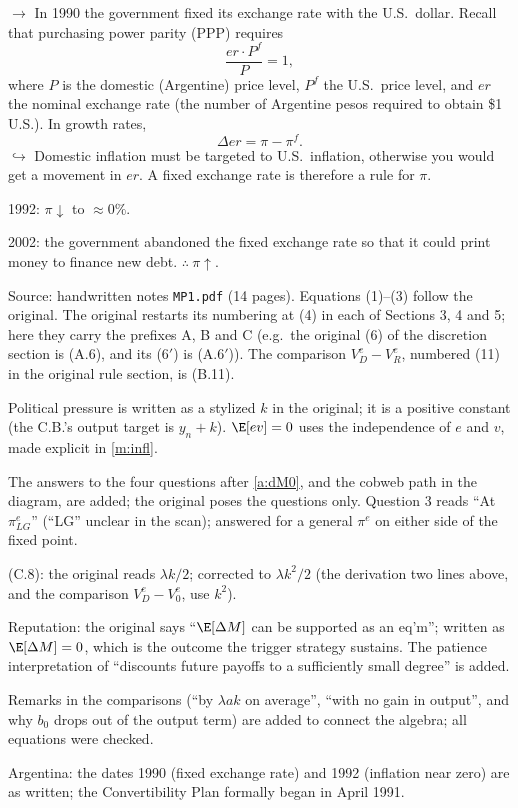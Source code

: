 \documentclass[11pt]{article}
\begin{document}
$\to$ In 1990 the government fixed its exchange rate with the U.S.\ dollar. Recall that
purchasing power parity (PPP) requires
\[
  \frac{er\cdot P^f}{P}=1,
\]
where $P$ is the domestic (Argentine) price level, $P^f$ the U.S.\ price level, and $er$
the nominal exchange rate (the number of Argentine pesos required to obtain \$1 U.S.).
In growth rates,
\[
  \Delta er=\pi-\pi^f .
\]
$\hookrightarrow$ Domestic inflation must be targeted to U.S.\ inflation, otherwise you
would get a movement in $er$. A fixed exchange rate is therefore a rule for $\pi$.

\begin{flatlist}
  \item 1992: $\pi\downarrow$ to $\approx 0\%$.
  \item 2002: the government abandoned the fixed exchange rate so that it could print
        money to finance new debt. $\therefore\ \pi\uparrow$.
\end{flatlist}


\begin{transcriptnotes}
  \item Source: handwritten notes \texttt{MP1.pdf} (14 pages). Equations (1)--(3) follow
        the original. The original restarts its numbering at (4) in each of Sections
        3, 4 and 5; here they carry the prefixes A, B and C (e.g.\ the original (6) of
        the discretion section is (A.6), and its (6$'$) is (A.6$'$)). The comparison
        $V_D^e-V_R^e$, numbered (11) in the original rule section, is (B.11).
  \item Political pressure is written as a stylized $k$ in the original; it is a
        positive constant (the C.B.'s output target is $y_n+k$). $\E[ev]=0$ uses the
        independence of $e$ and $v$, made explicit in \eqref{m:infl}.
  \item The answers to the four questions after \eqref{a:dM0}, and the cobweb path in
        the diagram, are added; the original poses the questions only. Question 3
        reads ``At $\pi^e_{LG}$'' (``LG'' unclear in the scan); answered for a general
        $\pi^e$ on either side of the fixed point.
  \item (C.8): the original reads $\lambda k/2$; corrected to $\lambda k^2/2$ (the
        derivation two lines above, and the comparison $V_D^e-V_0^e$, use $k^2$).
  \item Reputation: the original says ``$\E[\Delta M]$ can be supported as an eq'm'';
        written as $\E[\Delta M]=0$, which is the outcome the trigger strategy
        sustains. The patience interpretation of ``discounts future payoffs to a
        sufficiently small degree'' is added.
  \item Remarks in the comparisons (``by $\lambda ak$ on average'', ``with no gain in
        output'', and why $b_0$ drops out of the output term) are added to connect the
        algebra; all equations were checked.
  \item Argentina: the dates 1990 (fixed exchange rate) and 1992 (inflation near zero)
        are as written; the Convertibility Plan formally began in April 1991.
\end{transcriptnotes}
\end{document}
